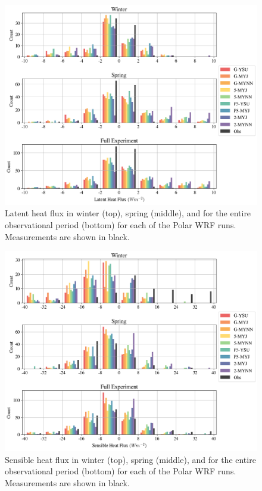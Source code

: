 \begin{figure}[H]
    \centering
    \includegraphics[width=1\linewidth]{figures/chapter3/WRF_LHF_Histo.png}
    \caption[Polar WRF simulation latent heat flux histograms]{Latent heat flux in winter (top), spring (middle), and for the entire observational period (bottom) for each of the Polar WRF runs. Measurements are shown in black.}
    \label{fig:wrf_hlf}
\end{figure}

\begin{figure}[H]
    \centering
    \includegraphics[width=1\linewidth]{figures/chapter3/WRF_SHF_Histo.png}
    \caption[Polar WRF simulation sensible heat flux histograms]{Sensible heat flux in winter (top), spring (middle), and for the entire observational period (bottom) for each of the Polar WRF runs. Measurements are shown in black.}
    \label{fig:wrf_shf}
\end{figure}

